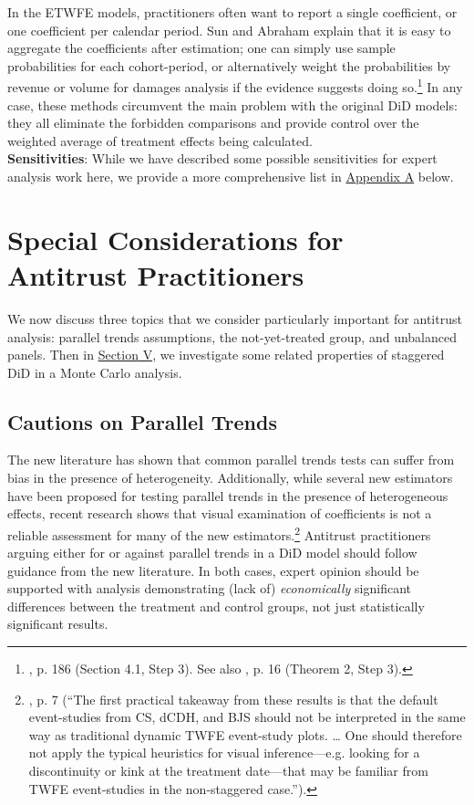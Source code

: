 \documentclass[12pt]{article}
\begin{document}
In the ETWFE models, practitioners often want to report a single coefficient, or one coefficient per calendar period. Sun and Abraham explain that it is easy to aggregate the coefficients after estimation; one can simply use sample probabilities for each cohort-period, or alternatively weight the probabilities by revenue or volume for damages analysis if the evidence suggests doing so.\footnote{\citet{sunabr2021a}, p. 186 (Section 4.1, Step 3). See also \citet{borusyak2024revisiting}, p. 16 (Theorem 2, Step 3).}  In any case, these methods circumvent the main problem with the original DiD models: they all eliminate the forbidden comparisons and provide control over the weighted average of treatment effects being calculated.
\\
\textbf{Sensitivities}: While we have described some possible sensitivities for expert analysis work here, we provide a more comprehensive list in  \hyperref[sec:appendixa]{Appendix A} below.
\section{Special Considerations for Antitrust Practitioners} \label{sec:antitrust}
We now discuss three topics that we consider particularly important for antitrust analysis: parallel trends assumptions, the not-yet-treated group, and unbalanced panels. Then in  \hyperref[sec:analysis]{Section V}, we investigate some related properties of staggered DiD in a Monte Carlo analysis.
\subsection{Cautions on Parallel Trends} \label{sec:parallel-trends}
The new literature has shown that common parallel trends tests can suffer from bias in the presence of heterogeneity. Additionally, while several new estimators have been proposed for testing parallel trends in the presence of heterogeneous effects, recent research shows that visual examination of coefficients is not a reliable assessment for many of the new estimators.\footnote{\citet{roth2024a}, p. 7 (“The first practical takeaway from these results is that the default event-studies from CS, dCDH, and BJS should not be interpreted in the same way as traditional dynamic TWFE event-study plots. … One should therefore not apply the typical heuristics for visual inference—e.g. looking for a discontinuity or kink at the treatment date—that may be familiar from TWFE event-studies in the non-staggered case.”).}  Antitrust practitioners arguing either for or against parallel trends in a DiD model should follow guidance from the new literature. In both cases, expert opinion should be supported with analysis demonstrating (lack of) \textit{economically} significant differences between the treatment and control groups, not just statistically significant results.
\end{document}

